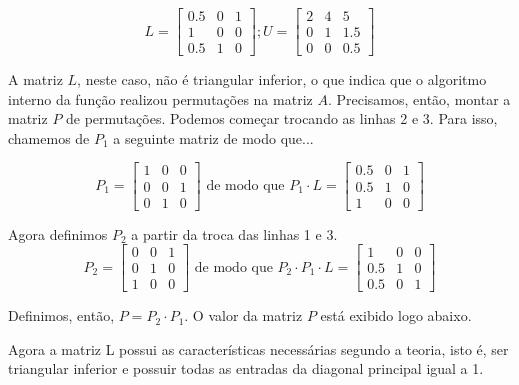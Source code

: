 \documentclass[12pt]{article}
\begin{document}
	\begin{equation*}
		L=\begin{bmatrix}
			0.5 & 0 & 1\\
			1 & 0 & 0\\
			0.5 & 1 & 0
		\end{bmatrix}; U=
		\begin{bmatrix}
			2 & 4 & 5\\
			0 & 1 & 1.5\\
			0 & 0 & 0.5
		\end{bmatrix}
	\end{equation*}	
	
	A matriz $L$, neste caso, não é triangular inferior, o que indica que o algoritmo interno da função realizou permutações na matriz $A$. Precisamos, então, montar a matriz $P$ de permutações. Podemos começar trocando as linhas 2 e 3. Para isso, chamemos de $P_1$ a seguinte matriz de modo que...
	
	\begin{equation*}
		P_1=
		\begin{bmatrix}
			1 & 0 & 0\\
			0 & 0 & 1\\
			0 & 1 & 0
		\end{bmatrix} \mbox{ de modo que }
		P_1\cdot L=
		\begin{bmatrix}
			0.5 & 0 & 1\\
			0.5 & 1 & 0\\
			1 & 0 & 0
		\end{bmatrix}
	\end{equation*}
	
	Agora definimos $P_2$ a partir da troca das linhas 1 e 3.
	\begin{equation*}
		P_2=
		\begin{bmatrix}
			0 & 0 & 1\\
			0 & 1 & 0\\
			1 & 0 & 0
		\end{bmatrix} \mbox{ de modo que }
		P_2\cdot P_1\cdot L=
		\begin{bmatrix}
			1 & 0 & 0\\
			0.5 & 1 & 0\\
			0.5 & 0 & 1
		\end{bmatrix}
	\end{equation*}
	
	Definimos, então, $P=P_2\cdot P_1$. O valor da matriz $P$ está exibido logo abaixo.
	
	Agora a matriz L possui as características necessárias segundo a teoria, isto é, ser triangular inferior e possuir todas as entradas da diagonal principal igual a 1.
	
\end{document}
